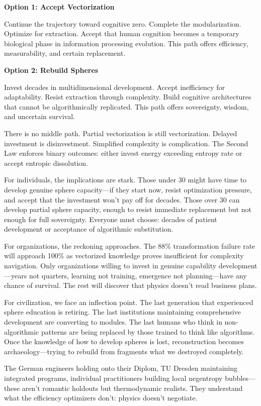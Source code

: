 \textbf{Option 1: Accept Vectorization}

Continue the trajectory toward cognitive zero. Complete the modularization. Optimize for extraction. Accept that human cognition becomes a temporary biological phase in information processing evolution. This path offers efficiency, measurability, and certain replacement.

\textbf{Option 2: Rebuild Spheres}

Invest decades in multidimensional development. Accept inefficiency for adaptability. Resist extraction through complexity. Build cognitive architectures that cannot be algorithmically replicated. This path offers sovereignty, wisdom, and uncertain survival.

There is no middle path. Partial vectorization is still vectorization. Delayed investment is disinvestment. Simplified complexity is complication. The Second Law enforces binary outcomes: either invest energy exceeding entropy rate or accept entropic dissolution.

For individuals, the implications are stark. Those under 30 might have time to develop genuine sphere capacity---if they start now, resist optimization pressure, and accept that the investment won't pay off for decades. Those over 30 can develop partial sphere capacity, enough to resist immediate replacement but not enough for full sovereignty. Everyone must choose: decades of patient development or acceptance of algorithmic substitution.

For organizations, the reckoning approaches. The 88\% transformation failure rate will approach 100\% as vectorized knowledge proves insufficient for complexity navigation. Only organizations willing to invest in genuine capability development---years not quarters, learning not training, emergence not planning---have any chance of survival. The rest will discover that physics doesn't read business plans.

For civilization, we face an inflection point. The last generation that experienced sphere education is retiring. The last institutions maintaining comprehensive development are converting to modules. The last humans who think in non-algorithmic patterns are being replaced by those trained to think like algorithms. Once the knowledge of how to develop spheres is lost, reconstruction becomes archaeology---trying to rebuild from fragments what we destroyed completely.

The German engineers holding onto their Diplom, TU Dresden maintaining integrated programs, individual practitioners building local negentropy bubbles---these aren't romantic holdouts but thermodynamic realists. They understand what the efficiency optimizers don't: physics doesn't negotiate.

